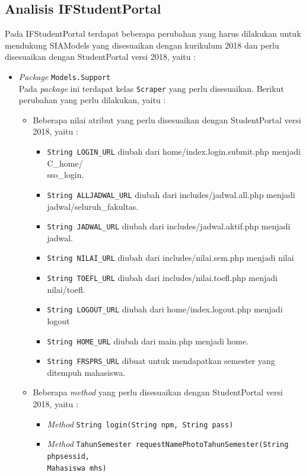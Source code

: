 \subsection{Analisis IFStudentPortal}
\label{subbab:analisisifstudentportal}
Pada IFStudentPortal terdapat beberapa perubahan yang harus dilakukan untuk mendukung SIAModels yang disesuaikan dengan kurikulum 2018 dan perlu disesuaikan dengan StudentPortal versi 2018, yaitu :
\begin{itemize}
	\item \textit{Package} \texttt{Models.Support} \\
	Pada \textit{package} ini terdapat kelas \texttt{Scraper} yang perlu disesuaikan. Berikut perubahan yang perlu dilakukan, yaitu :
	\begin{itemize}
		\item Beberapa nilai atribut yang perlu disesuaikan dengan StudentPortal versi 2018, yaitu :
		\begin{itemize}
			\item \texttt{String LOGIN\_URL} diubah dari home/index.login.submit.php menjadi C\_home/\\sso\_login.
			\item \texttt{String ALLJADWAL\_URL} diubah dari includes/jadwal.all.php menjadi jadwal/seluruh\_fakultas.
			\item \texttt{String JADWAL\_URL} diubah dari includes/jadwal.aktif.php menjadi jadwal.
			\item \texttt{String NILAI\_URL} diubah dari includes/nilai.sem.php menjadi nilai
			\item \texttt{String TOEFL\_URL} diubah dari includes/nilai.toefl.php menjadi nilai/toefl.
			\item \texttt{String LOGOUT\_URL} diubah dari home/index.logout.php menjadi logout
			\item \texttt{String HOME\_URL} diubah dari main.php menjadi home.
			\item \texttt{String FRSPRS\_URL} dibuat untuk mendapatkan semester yang ditempuh mahasiswa.
		\end{itemize}
		\item Beberapa \textit{method} yang perlu disesuaikan dengan StudentPortal versi 2018, yaitu :
		\begin{itemize}
			\item \textit{Method} \texttt{String login(String npm, String pass)}
			\item \textit{Method} \texttt{TahunSemester requestNamePhotoTahunSemester(String phpsessid, \\Mahasiswa mhs)}

\end{itemize}
\end{itemize}
\end{itemize}
